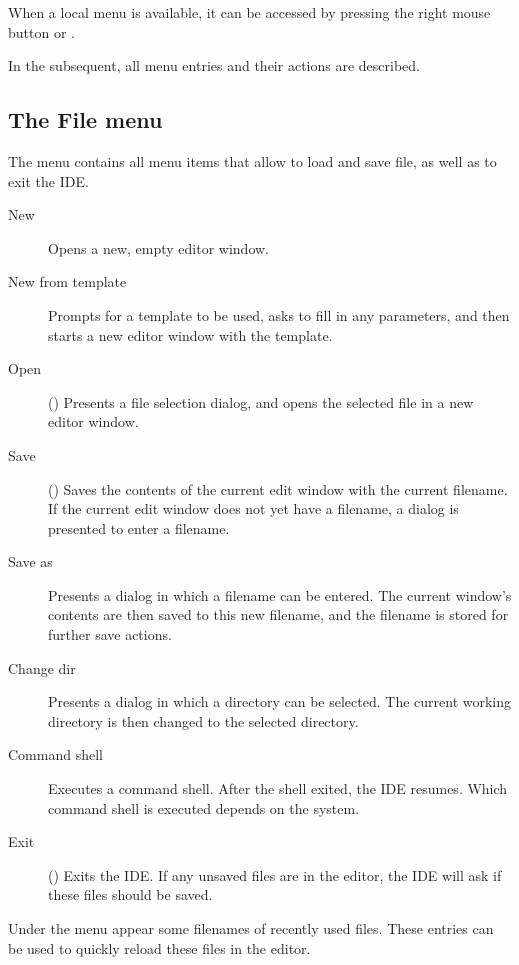 When a local menu is available, it can be accessed by pressing
the right mouse button or . 

In the subsequent, all menu entries and their actions are described.
%
%
\subsection{The File menu}
\label{se:menufile}
The  menu contains all menu items that allow to load and save file, as
well as to exit the IDE.
\begin{description}
\item[New] Opens a new, empty editor window. 
\item[New from template] Prompts for a template to be used, asks to fill in
any parameters, and then starts a new editor window with the template.
\item[Open] () Presents a file selection dialog, and opens 
the selected file in a new editor window. 
\item[Save] () Saves the contents of the current edit window 
with the current filename. If the current edit window does not yet have
a filename, a dialog is presented to enter a filename.
\item[Save as] Presents a dialog in which a filename can be entered. The
current window's contents are then saved to this new filename, and the
filename is stored for further save actions.
\item[Change dir] Presents a dialog in which a directory can be selected.
The current working directory is then changed to the selected directory.
\item[Command shell] Executes a command shell. After the shell exited, the
IDE resumes. Which command shell is executed depends on the system. 
\item[Exit] () Exits the IDE. If any unsaved files are 
in the editor, the IDE will ask if these files should be saved.
\end{description}
Under the  menu appear some filenames of recently used files.
These entries can be used to quickly reload these files in the editor.

%
%
